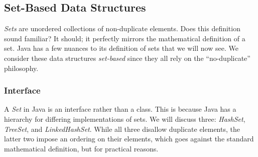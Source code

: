 \subsection*{Set-Based Data Structures}
\textit{Sets} are unordered collections of non-duplicate elements. Does this definition sound familiar? It should; it perfectly mirrors the mathematical definition of a set. Java has a few nuances to its definition of sets that we will now see. We consider these data structures \textit{set-based} since they all rely on the ``no-duplicate'' philosophy.

\subsubsection*{ Interface}
A \textit{Set} in Java is an interface rather than a class. This is because Java has a hierarchy for differing implementations of sets. We will discuss three: \textit{HashSet}, \textit{TreeSet}, and \textit{LinkedHashSet}. While all three disallow duplicate elements, the latter two impose an ordering on their elements, which goes against the standard mathematical definition, but for practical reasons.

